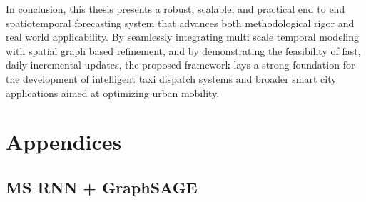 \documentclass{article}
\begin{document}
In conclusion, this thesis presents a robust, scalable, and practical end to end spatiotemporal forecasting system that advances both methodological rigor and real world applicability. By seamlessly integrating multi scale temporal modeling with spatial graph based refinement, and by demonstrating the feasibility of fast, daily incremental updates, the proposed framework lays a strong foundation for the development of intelligent taxi dispatch systems and broader smart city applications aimed at optimizing urban mobility.


   
   

\clearpage
\appendix
\section{Appendices}

\subsection{MS RNN + GraphSAGE}
\end{document}
